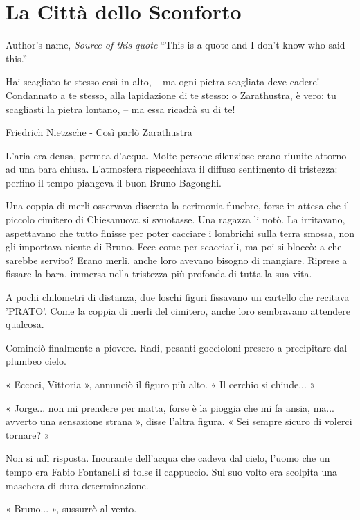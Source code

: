 \chapter{La Città dello Sconforto}

\begin{chapquote}{Author's name, \textit{Source of this quote}}
``This is a quote and I don't know who said this.''
\end{chapquote}


Hai scagliato te stesso così in alto, – ma ogni pietra scagliata deve cadere! Condannato a te stesso, alla lapidazione di te stesso: o Zarathustra, è vero: tu scagliasti la pietra lontano, – ma essa ricadrà su di te!

Friedrich Nietzsche - Così parlò Zarathustra


L'aria era densa, permea d'acqua. Molte persone silenziose erano riunite attorno ad una bara chiusa. L'atmosfera rispecchiava il diffuso sentimento di tristezza: perfino il tempo piangeva il buon Bruno Bagonghi.

Una coppia di merli osservava discreta la cerimonia funebre, forse in attesa che il piccolo cimitero di Chiesanuova si svuotasse. Una ragazza li notò. La irritavano, aspettavano che tutto finisse per poter cacciare i lombrichi sulla terra smossa, non gli importava niente di Bruno. Fece come per scacciarli, ma poi si bloccò: a che sarebbe servito? Erano merli, anche loro avevano bisogno di mangiare. Riprese a fissare la bara, immersa nella tristezza più profonda di tutta la sua vita.

A pochi chilometri di distanza, due loschi figuri fissavano un cartello che recitava 'PRATO'. Come la coppia di merli del cimitero, anche loro sembravano attendere qualcosa.

Cominciò finalmente a piovere. Radi, pesanti goccioloni presero a precipitare dal plumbeo cielo. 

« Eccoci, Vittoria », annunciò il figuro più alto. « Il cerchio si chiude... »

« Jorge... non mi prendere per matta, forse è la pioggia che mi fa ansia, ma... avverto una sensazione strana », disse l'altra figura. « Sei sempre sicuro di volerci tornare? »

Non si udì risposta. Incurante dell'acqua che cadeva dal cielo, l'uomo che un tempo era Fabio Fontanelli si tolse il cappuccio. Sul suo volto era scolpita una maschera di dura determinazione.

« Bruno... », sussurrò al vento.


